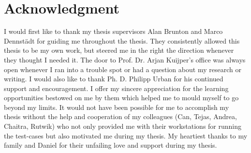 \documentclass[type=msc,colorback,accentcolor=tud1d,bigchapter]{tudthesis}
\begin{document}
\chapter*{Acknowledgment}
I would first like to thank my thesis supervisors Alan Brunton and Marco Dennst{\"a}dt for guiding me throughout the thesis. They consistently allowed this thesis to be my own work, but steered me in the right the direction whenever they thought I needed it. The door to Prof. Dr. Arjan Kuijper's office was always open whenever I ran into a trouble spot or had a question about my research or writing. I would also like to thank Ph. D. Philipp Urban for his continued support and encouragement. I offer my sincere appreciation for the learning opportunities bestowed on me by them which helped me to mould myself to go beyond my limits. It would not have been possible for me to accomplish my thesis without the help and cooperation of my colleagues (Can, Tejas, Andrea, Chaitra, Rutwik) who not only provided me with their workstations for running the test-cases but also motivated me during my thesis. My heartiest thanks to my family and Daniel for their unfailing love and support during my thesis. 
\newpage

\tableofcontents
\newpage
\listoffigures
\newpage
\lstlistoflistings
\newpage
\listoftables
\newpage


\newpage

\newpage

\newpage

\newpage

\newpage

\newpage

\newpage

\newpage
\printbibliography
\end{document}
